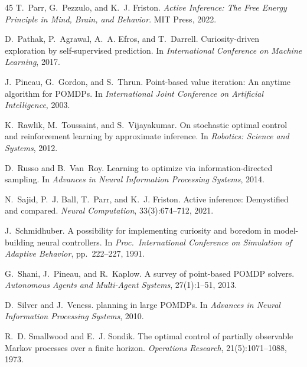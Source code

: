 \documentclass{article}
\begin{document}
{\begin{thebibliography}{45}
T.~Parr, G.~Pezzulo, and K.~J. Friston.
\newblock \emph{Active Inference: The Free Energy Principle in Mind, Brain, and Behavior}.
\newblock MIT Press, 2022.

D.~Pathak, P.~Agrawal, A.~A. Efros, and T.~Darrell.
\newblock Curiosity-driven exploration by self-supervised prediction.
\newblock In \emph{International Conference on Machine Learning}, 2017.

J.~Pineau, G.~Gordon, and S.~Thrun.
\newblock Point-based value iteration: An anytime algorithm for {POMDP}s.
\newblock In \emph{International Joint Conference on Artificial Intelligence}, 2003.

K.~Rawlik, M.~Toussaint, and S.~Vijayakumar.
\newblock On stochastic optimal control and reinforcement learning by approximate inference.
\newblock In \emph{Robotics: Science and Systems}, 2012.

D.~Russo and B.~Van~Roy.
\newblock Learning to optimize via information-directed sampling.
\newblock In \emph{Advances in Neural Information Processing Systems}, 2014.

N.~Sajid, P.~J. Ball, T.~Parr, and K.~J. Friston.
\newblock Active inference: Demystified and compared.
\newblock \emph{Neural Computation}, 33(3):674--712, 2021.

J.~Schmidhuber.
\newblock A possibility for implementing curiosity and boredom in model-building neural controllers.
\newblock In \emph{Proc.\ International Conference on Simulation of Adaptive Behavior}, pp.\ 222--227, 1991.

G.~Shani, J.~Pineau, and R.~Kaplow.
\newblock A survey of point-based {POMDP} solvers.
\newblock \emph{Autonomous Agents and Multi-Agent Systems}, 27(1):1--51, 2013.

D.~Silver and J.~Veness.
 planning in large {POMDP}s.
\newblock In \emph{Advances in Neural Information Processing Systems}, 2010.

R.~D. Smallwood and E.~J. Sondik.
\newblock The optimal control of partially observable {M}arkov processes over a finite horizon.
\newblock \emph{Operations Research}, 21(5):1071--1088, 1973.


\end{thebibliography}}
\end{document}
